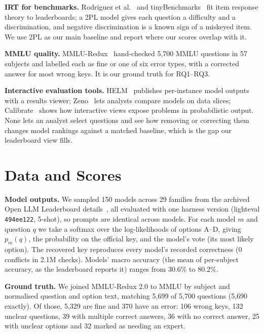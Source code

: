 \documentclass[10pt]{article}
\begin{document}
\textbf{IRT for benchmarks.} Rodriguez et al.~\cite{rodriguez} and tinyBenchmarks~\cite{tiny} fit
item response theory to leaderboards; a 2PL model gives each question a difficulty and a
discrimination, and negative discrimination is a known sign of a miskeyed item. We use 2PL as our
main baseline and report where our scores overlap with it.

\textbf{MMLU quality.} MMLU-Redux~\cite{redux} hand-checked 5,700 MMLU questions in 57 subjects and
labelled each as fine or one of six error types, with a corrected answer for most wrong keys. It is
our ground truth for RQ1--RQ3.

\textbf{Interactive evaluation tools.} HELM~\cite{helm} publishes per-instance model outputs with a
results viewer; Zeno~\cite{zeno} lets analysts compare models on data slices; Calibrate~\cite{calibrate}
shows how interactive views expose problems in probabilistic output. None lets an analyst select
questions and see how removing or correcting them changes model rankings against a matched baseline,
which is the gap our leaderboard view fills.

\section{Data and Scores}

\textbf{Model outputs.} We sampled 150 models across 29 families from the archived Open LLM Leaderboard
details~\cite{openllm}, all evaluated with one harness version (lighteval \texttt{494ee122}, 5-shot),
so prompts are identical across models. For each model $m$ and question $q$ we take a softmax over the
log-likelihoods of options A--D, giving $p_m(q)$, the probability on the official key, and the model's
vote (its most likely option). The recovered key reproduces every model's recorded correctness
(0 conflicts in 2.1M checks). Models' macro accuracy (the mean of per-subject accuracy, as the
leaderboard reports it) ranges from 30.6\% to 80.2\%.

\textbf{Ground truth.} We joined MMLU-Redux 2.0 to MMLU by subject and normalised question and option
text, matching 5,699 of 5,700 questions (5,690 exactly). Of those, 5,329 are fine and 370 have an
error: 106 wrong keys, 132 unclear questions, 39 with multiple correct answers, 36 with no correct
answer, 25 with unclear options and 32 marked as needing an expert.
\end{document}
